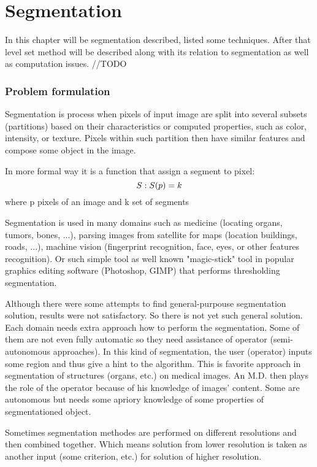 \chapter{Segmentation}

In this chapter will be segmentation described, listed some techniques. After that level set method will be described along with its relation to segmentation as well as computation issues. //TODO

\subsection{Problem formulation}
Segmentation is process when pixels of input image are split into several subsets (partitions) based on their characteristics or computed properties, such as color, intensity, or texture. Pixels within such partition then have similar features and compose some object in the image.

In more formal way it is a function that assign a segment to pixel:
\begin{equation}
$$S: S(p) = k$$
\end{equation}
where p \in pixels of an image and k \in set of segments

Segmentation is used in many domains such as medicine (locating organs, tumors, bones, ...), parsing images from satellite for maps (location buildings, roads, ...), machine vision (fingerprint recognition, face, eyes, or other features recognition). Or such simple tool as well known "magic-stick" tool in popular graphics editing software (Photoshop, GIMP) that performs thresholding segmentation.

Although there were some attempts to find general-purpouse segmentation solution, results were not satisfactory. So there is not yet such general solution. Each domain needs extra approach how to perform the segmentation. Some of them are not even fully automatic so they need assistance of operator (semi-autonomous approaches). In this kind of segmentation, the user (operator) inputs some region and thus give a hint to the algorithm. This is favorite approach in segmentation of structures (organs, etc.) on medical images. An M.D. then plays the role of the operator because of his knowledge of images' content. Some are autonomous but needs some apriory knowledge of some properties of segmentationed object. 

Sometimes segmentation methodes are performed on different resolutions and then combined together. Which means solution from lower resolution is taken as another input (some criterion, etc.) for solution of higher resolution. 

